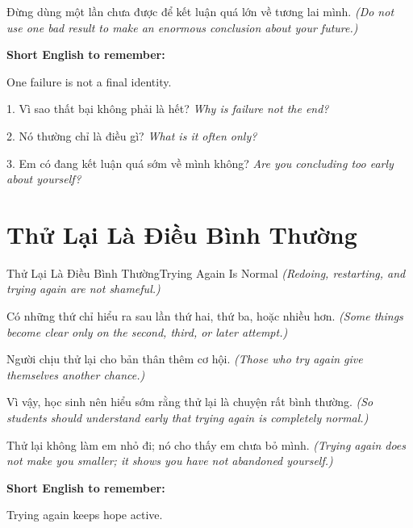 \begin{baihoc}
Đừng dùng một lần chưa được để kết luận quá lớn về tương lai mình.
\textit{(Do not use one bad result to make an enormous conclusion about your future.)}
\end{baihoc}

\begin{ghinhoanh}
\textbf{Short English to remember:}

One failure is not a final identity.

\end{ghinhoanh}

\begin{tuhocnhanh}
1. Vì sao thất bại không phải là hết? \textit{Why is failure not the end?}

2. Nó thường chỉ là điều gì? \textit{What is it often only?}

3. Em có đang kết luận quá sớm về mình không? \textit{Are you concluding too early about yourself?}
\end{tuhocnhanh}
\ngancach

\section{Thử Lại Là Điều Bình Thường}
\begin{truyen}{Thử Lại Là Điều Bình Thường}{Trying Again Is Normal}
\textit{(Redoing, restarting, and trying again are not shameful.)}

Có những thứ chỉ hiểu ra sau lần thứ hai, thứ ba, hoặc nhiều hơn.
\textit{(Some things become clear only on the second, third, or later attempt.)}

Người chịu thử lại cho bản thân thêm cơ hội.
\textit{(Those who try again give themselves another chance.)}

Vì vậy, học sinh nên hiểu sớm rằng thử lại là chuyện rất bình thường.
\textit{(So students should understand early that trying again is completely normal.)}
\end{truyen}

\begin{baihoc}
Thử lại không làm em nhỏ đi; nó cho thấy em chưa bỏ mình.
\textit{(Trying again does not make you smaller; it shows you have not abandoned yourself.)}
\end{baihoc}

\begin{ghinhoanh}
\textbf{Short English to remember:}

Trying again keeps hope active.

\end{ghinhoanh}

